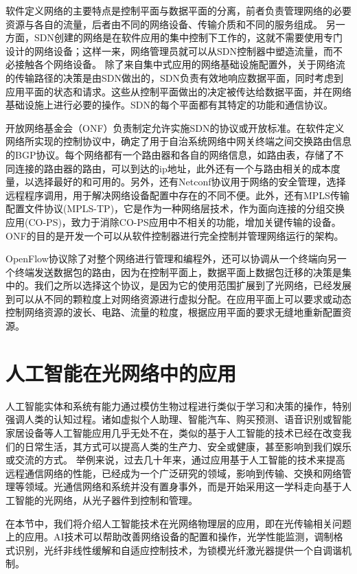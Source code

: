 \documentclass[degree=project,degree-type=project,cjk-font=noto]{thuthesis}
\begin{document}
软件定义网络的主要特点是控制平面与数据平面的分离，前者负责管理网络的必要资源与各自的流量，后者由不同的网络设备、传输介质和不同的服务组成。
另一方面，SDN创建的网络是在软件应用的集中控制下工作的，这就不需要使用专门设计的网络设备；这样一来，网络管理员就可以从SDN控制器中塑造流量，而不必接触各个网络设备。
除了来自集中式应用的网络基础设施配置外，关于网络流的传输路径的决策是由SDN做出的，SDN负责有效地响应数据平面，同时考虑到应用平面的状态和请求。这些从控制平面做出的决定被传达给数据平面，并在网络基础设施上进行必要的操作。SDN的每个平面都有其特定的功能和通信协议。

开放网络基金会（ONF）负责制定允许实施SDN的协议或开放标准。在软件定义网络所实现的控制协议中，确定了用于自治系统网络中网关终端之间交换路由信息的BGP协议。每个网络都有一个路由器和各自的网络信息，如路由表，存储了不同连接的路由器的路由，可以到达的ip地址，此外还有一个与路由相关的成本度量，以选择最好的和可用的。另外，还有Netconf协议用于网络的安全管理，选择远程程序调用，用于解决网络设备配置中存在的不同不便。此外，还有MPLS传输配置文件协议(MPLS-TP)，它是作为一种网络层技术，作为面向连接的分组交换应用(CO-PS)，致力于消除CO-PS应用中不相关的功能，增加关键传输的设备。ONF的目的是开发一个可以从软件控制器进行完全控制并管理网络运行的架构。

OpenFlow协议除了对整个网络进行管理和编程外，还可以协调从一个终端向另一个终端发送数据包的路由，因为在控制平面上，数据平面上数据包迁移的决策是集中的。我们之所以选择这个协议，是因为它的使用范围扩展到了光网络，已经发展到可以从不同的颗粒度上对网络资源进行虚拟分配。在应用平面上可以要求或动态控制网络资源的波长、电路、流量的粒度，根据应用平面的要求无缝地重新配置资源。

\chapter{人工智能在光网络中的应用}

人工智能实体和系统有能力通过模仿生物过程进行类似于学习和决策的操作，特别强调人类的认知过程。诸如虚拟个人助理、智能汽车、购买预测、语音识别或智能家居设备等人工智能应用几乎无处不在，类似的基于人工智能的技术已经在改变我们的日常生活，其方式可以提高人类的生产力、安全或健康，甚至影响到我们娱乐或交流的方式。
举例来说，过去几十年来，通过应用基于人工智能的技术来提高远程通信网络的性能，已经成为一个广泛研究的领域，影响到传输、交换和网络管理等领域。光通信网络和系统并没有置身事外，而是开始采用这一学科走向基于人工智能的光网络，从光子器件到控制和管理。

在本节中，我们将介绍人工智能技术在光网络物理层的应用，即在光传输相关问题上的应用。AI技术可以帮助改善网络设备的配置和操作，光学性能监测，调制格式识别，光纤非线性缓解和自适应控制技术，为锁模光纤激光器提供一个自调谐机制。
\end{document}
